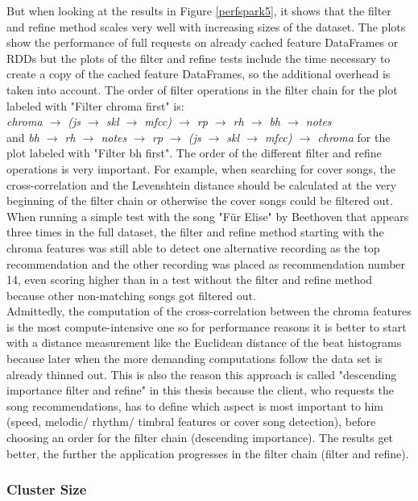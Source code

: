 \noindent But when looking at the results in Figure \ref{perfspark5}, it shows that the filter and refine method scales very well with increasing sizes of the dataset. The plots show the performance of full requests on already cached feature DataFrames or RDDs but the plots of the filter and refine tests include the time necessary to create a copy of the cached feature DataFrames, so the additional overhead is taken into account. 
\noindent The order of filter operations in the filter chain for the plot labeled with "Filter chroma first" is:\\
\textit{chroma $\rightarrow$ (js  $\rightarrow$ skl  $\rightarrow$ mfcc) $\rightarrow$ rp  $\rightarrow$ rh  $\rightarrow$ bh  $\rightarrow$ notes}\\ and 
\textit{bh $\rightarrow$ rh $\rightarrow$ notes $\rightarrow$ rp $\rightarrow$ (js  $\rightarrow$ skl  $\rightarrow$ mfcc) $\rightarrow$ chroma} for the plot labeled with "Filter bh first".
\noindent The order of the different filter and refine operations is very important. For example, when searching for cover songs, the cross-correlation and the Levenshtein distance should be calculated at the very beginning of the filter chain or otherwise the cover songs could be filtered out. When running a simple test with the song "Für Elise" by Beethoven that appears three times in the full dataset, the filter and refine method starting with the chroma features was still able to detect one alternative recording as the top recommendation and the other recording was placed as recommendation number 14, even scoring higher than in a test without the filter and refine method because other non-matching songs got filtered out.\\
Admittedly, the computation of the cross-correlation between the chroma features is the most compute-intensive one so for performance reasons it is better to start with a distance measurement like the Euclidean distance of the beat histograms because later when the more demanding computations follow the data set is already thinned out. 
This is also the reason this approach is called "descending importance filter and refine" in this thesis because the client, who requests the song recommendations, has to define which aspect is most important to him (speed, melodic/ rhythm/ timbral features or cover song detection), before choosing an order for the filter chain (descending importance). The results get better, the further the application progresses in the filter chain (filter and refine).

\subsubsection{Cluster Size}

